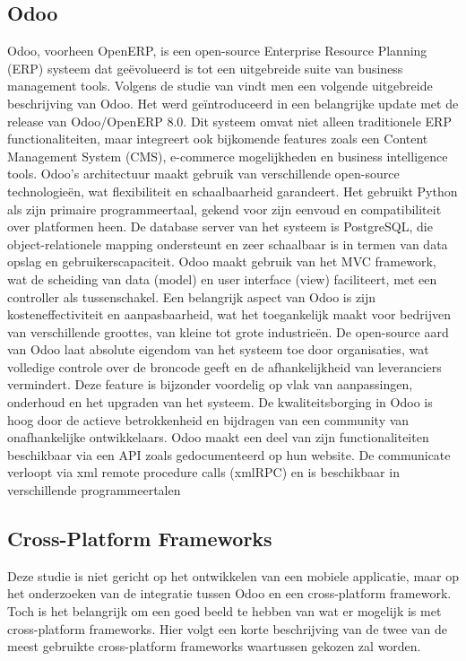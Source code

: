 \subsection{Odoo}%
\label{subsec:odoo}
Odoo, voorheen OpenERP, is een open-source Enterprise Resource Planning (ERP) systeem dat geëvolueerd is tot een uitgebreide suite van business management tools.
Volgens de studie van \textcite{GaneshEtAl2016} vindt men een volgende uitgebreide beschrijving van Odoo.
Het werd geïntroduceerd in een belangrijke update met de release van Odoo/OpenERP 8.0.
Dit systeem omvat niet alleen traditionele ERP functionaliteiten, maar integreert ook bijkomende features zoals een Content Management System (CMS), e-commerce mogelijkheden en business intelligence tools.
\bigskip
Odoo's architectuur maakt gebruik van verschillende open-source technologieën, wat flexibiliteit en schaalbaarheid garandeert.
Het gebruikt Python als zijn primaire programmeertaal, gekend voor zijn eenvoud en compatibiliteit over platformen heen.
De database server van het systeem is PostgreSQL, die object-relationele mapping ondersteunt en zeer schaalbaar is in termen van data opslag en gebruikerscapaciteit.
Odoo maakt gebruik van het MVC framework, wat de scheiding van data (model) en user interface (view) faciliteert, met een controller als tussenschakel.
\bigskip
Een belangrijk aspect van Odoo is zijn kosteneffectiviteit en aanpasbaarheid, wat het toegankelijk maakt voor bedrijven van verschillende groottes, van kleine tot grote industrieën.
De open-source aard van Odoo laat absolute eigendom van het systeem toe door organisaties, wat volledige controle over de broncode geeft en de afhankelijkheid van leveranciers vermindert.
Deze feature is bijzonder voordelig op vlak van aanpassingen, onderhoud en het upgraden van het systeem.
De kwaliteitsborging in Odoo is hoog door de actieve betrokkenheid en bijdragen van een community van onafhankelijke ontwikkelaars.
\bigskip
Odoo maakt een deel van zijn functionaliteiten beschikbaar via een API zoals gedocumenteerd op hun website\cite{odooExternalApi}.
De communicate verloopt via xml remote procedure calls (xmlRPC) en is beschikbaar in verschillende programmeertalen\cite{xmlrpcWhatXMLRPC}

\subsection{Cross-Platform Frameworks}%
\label{subsec:cross-platform}
Deze studie is niet gericht op het ontwikkelen van een mobiele applicatie, maar op het onderzoeken van de integratie tussen Odoo en een cross-platform framework.
Toch is het belangrijk om een goed beeld te hebben van wat er mogelijk is met cross-platform frameworks.
Hier volgt een korte beschrijving van de twee van de meest gebruikte cross-platform frameworks waartussen gekozen zal worden.


